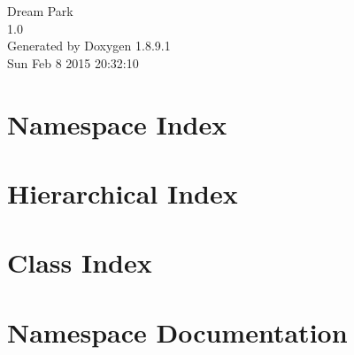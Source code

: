 \documentclass[twoside]{book}
\newcommand{\+}{\discretionary{\mbox{\scriptsize$\hookleftarrow$}}{}{}}
\newcommand{\clearemptydoublepage}{%
  \newpage{\pagestyle{empty}\cleardoublepage}%
}
\begin{document}
\hypersetup{pageanchor=false,
             bookmarks=true,
             bookmarksnumbered=true,
             pdfencoding=unicode
            }
\begin{titlepage}
\vspace*{7cm}
\begin{center}%
{\Large Dream Park \\[1ex]\large 1.\+0 }\\
\vspace*{1cm}
{\large Generated by Doxygen 1.8.9.1}\\
\vspace*{0.5cm}
{\small Sun Feb 8 2015 20:32:10}\\
\end{center}
\end{titlepage}
\clearemptydoublepage
\tableofcontents
\clearemptydoublepage
{}
\hypersetup{pageanchor=true}

\chapter{Namespace Index}

\chapter{Hierarchical Index}

\chapter{Class Index}

\chapter{Namespace Documentation}

















\end{document}
